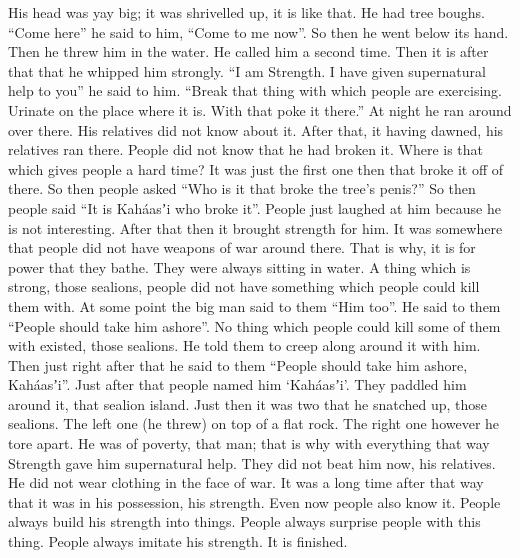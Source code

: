 \begin{pairs}
\begin{Rightside}
His head was yay big;
it was shrivelled up, it is like that.
He had tree boughs.
\qqk{}“Come here” he said to him,
\qqk{}“Come to me now”.
So then he went below its hand.
Then he threw him in the water.
He called him a second time.
Then it is after that that he whipped him strongly.
\qqk{}“I am Strength.
I have given supernatural help to you” he said to him.
\qqk{}“Break that thing with which people are exercising.
Urinate on the place where it is.
With that poke it there.”
\pend
\pstart
{}At night he ran around over there.
His relatives did not know about it.
After that, it having dawned, his relatives ran there.
People did not know that he had broken it.
Where is that which gives people a hard time?
It was just the first one then that broke it off of there.
So then people asked
\qqk{}“Who is it that broke the tree’s penis?”
So then people said
“It is Kaháasʼi who broke it”.
People just laughed at him because he is not interesting.
After that then it brought strength for him.
It was somewhere that people did not have weapons of war around there.
That is why, it is for power that they bathe.
They were always sitting in water.
A thing which is strong, those sealions,
		people did not have something which people could kill them with.
At some point the big man said to them “Him too”.
He said to them “People should take him ashore”.
No thing which people could kill some of them with existed, those sealions.
He told them to creep along around it with him.
Then just right after that he said to them
\qqk{}“People should take him ashore, Kaháasʼi”.
Just after that people named him ‘Kaháasʼi’.
They paddled him around it, that sealion island.
Just then it was two that he snatched up, those sealions.
The left one (he threw) on top of a flat rock.
The right one however he tore apart.
He was of poverty, that man;
that is why with everything that way Strength gave him supernatural help.
They did not beat him now, his relatives.
He did not wear clothing in the face of war.
It was a long time after that way that it was in his possession, his strength.
Even now people also know it.
People always build his strength into things.
People always surprise people with this thing.
People always imitate his strength.
It is finished.
\pend
\endnumbering
\end{Rightside}
\end{pairs}
\Columns

